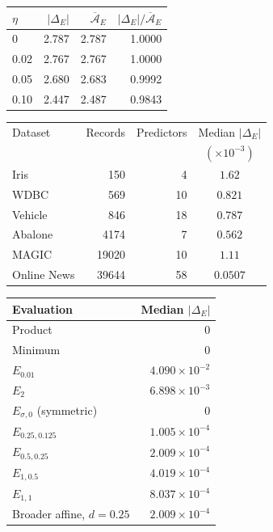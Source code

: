 \begin{table}
\label{tab:controlled}
\begin{tabular}{lrrr}
\toprule
$\eta$ & $|\Delta_E|$ & $\overline{\mathcal A}_E$ & $|\Delta_E|/\overline{\mathcal A}_E$ \\
\midrule
0 & 2.787 & 2.787 & 1.0000 \\
0.02 & 2.767 & 2.767 & 1.0000 \\
0.05 & 2.680 & 2.683 & 0.9992 \\
0.10 & 2.447 & 2.487 & 0.9843 \\
\bottomrule
\end{tabular}
\end{table}

\begin{table}
\label{tab:static-benchmarks}
\begin{tabular}{lrrc}
\toprule
Dataset & Records & Predictors & {\color{red}Median $|\Delta_E|$} \\
 & & & $(\times10^{-3})$ \\
\midrule
Iris & 150 & 4 & {\color{red}$1.62$} \\
WDBC & 569 & 10 & {\color{red}$0.821$} \\
Vehicle & 846 & 18 & {\color{red}$0.787$} \\
Abalone & 4174 & 7 & {\color{red}$0.562$} \\
MAGIC & 19020 & 10 & {\color{red}$1.11$} \\
Online News & 39644 & 58 & {\color{red}$0.0507$} \\
\bottomrule
\end{tabular}
\end{table}

\begin{table}
\label{tab:static-operator-comparison}
\begin{tabular}{lr}
\toprule
Evaluation & Median $|\Delta_E|$ \\
\midrule
Product & $0$ \\
Minimum & $0$ \\
$E_{0.01}$ & $4.090\times10^{-2}$ \\
$E_2$ & $6.898\times10^{-3}$ \\
$E_{\sigma,0}$ (symmetric) & $0$ \\
$E_{0.25,0.125}$ & $1.005\times10^{-4}$ \\
$E_{0.5,0.25}$ & $2.009\times10^{-4}$ \\
$E_{1,0.5}$ & $4.019\times10^{-4}$ \\
$E_{1,1}$ & $8.037\times10^{-4}$ \\
Broader affine, $d=0.25$ & $2.009\times10^{-4}$ \\
\bottomrule
\end{tabular}
\end{table}


